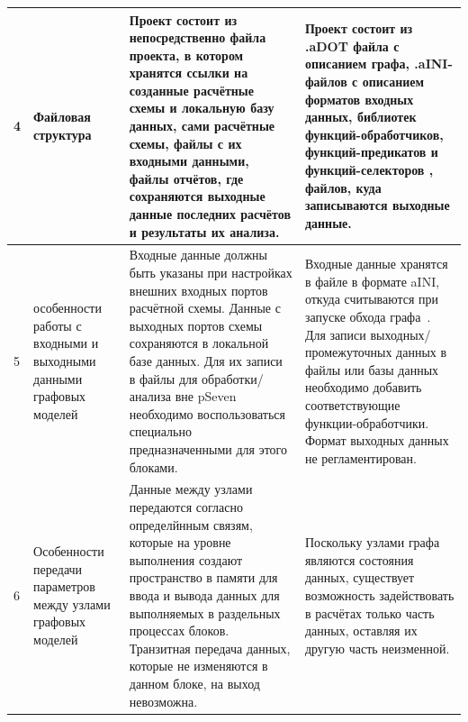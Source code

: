 \begin{landscape}
\begin{longtable}{|p{}|p{}|p{}|p{}|}
    \hline
    4          & Файловая структура                                                                                                                   & Проект состоит из непосредственно файла проекта, в котором хранятся ссылки на созданные расчётные схемы и локальную базу данных, сами расчётные схемы, файлы с их входными данными, файлы отчётов, где сохраняются выходные данные последних расчётов и результаты их анализа.                                                                                                                                                                                                                                                                                                        & Проект состоит из \textsf{.aDOT} файла с описанием графа, \textsf{.aINI}-файлов с описанием форматов входных данных, библиотек функций-обработчиков, функций-предикатов и функций-селекторов , файлов, куда записываются выходные данные.                                                                       \\
    \hline
    5          & особенности работы с входными и выходными данными графовых моделей                                                                   & Входные данные должны быть указаны при настройках внешних входных портов расчётной схемы. Данные с выходных портов схемы сохраняются в локальной базе данных. Для их записи в файлы для обработки/анализа вне pSeven необходимо воспользоваться специально предназначенными для этого блоками.                                                                                                                                                                                                                                                                                        & Входные данные хранятся в файле в формате \gls{aINI}\cite{SokAINI}, откуда считываются при запуске обхода графа~\cite{SokolovPershin2017}. Для записи выходных/промежуточных данных в файлы или базы данных необходимо добавить соответствующие функции-обработчики. Формат выходных данных не регламентирован. \\
    \hline
    6          & Особенности передачи параметров между узлами графовых моделей                                                                        & Данные между узлами передаются согласно определйнным связям, которые на уровне выполнения создают пространство в памяти для ввода и вывода данных для выполняемых в раздельных процессах блоков. Транзитная передача данных, которые не изменяются в данном блоке, на выход невозможна.                                                                                                                                                                                                                                                                                               & Поскольку узлами графа являются состояния данных, существует возможность задействовать в расчётах только часть данных, оставляя их другую часть неизменной.                                                                                                                                                     \\

\end{longtable}
\end{landscape}
